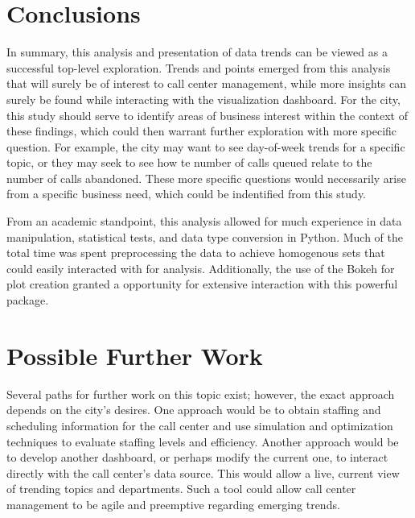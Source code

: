 \documentclass[11pt,twocolumn]{article}
\begin{document}
\section{Conclusions}

In summary, this analysis and presentation of data trends can be viewed as a successful top-level exploration.  Trends and points emerged from this analysis that will surely be of interest to call center management, while more insights can surely be found while interacting with the visualization dashboard.  For the city, this study should serve to identify areas of business interest within the context of these findings, which could then warrant further exploration with more specific question.  For example, the city may want to see day-of-week trends for a specific topic, or they may seek to see how te number of calls queued relate to the number of calls abandoned.  These more specific questions would necessarily arise from a specific business need, which could be indentified from this study.
\par
From an academic standpoint, this analysis allowed for much experience in data manipulation, statistical tests, and data type conversion in Python.  Much of the total time was spent preprocessing the data to achieve homogenous sets that could easily interacted with for analysis.  Additionally, the use of the Bokeh for plot creation granted a opportunity for extensive interaction with this powerful package.

\section{Possible Further Work}

Several paths for further work on this topic exist; however, the exact approach depends on the city's desires.  One approach would be to obtain staffing and scheduling information for the call center and use simulation and optimization techniques to evaluate staffing levels and efficiency.  Another approach would be to develop another dashboard, or perhaps modify the current one, to interact directly with the call center's data source.  This would allow a live, current view of trending topics and departments.  Such a tool could allow call center management to be agile and preemptive regarding emerging trends.
\end{document}
